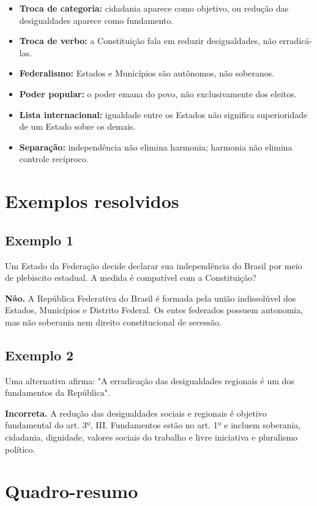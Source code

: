 \documentclass[11pt,a4paper]{article}
\begin{document}
\begin{itemize}
  \item \textbf{Troca de categoria:} cidadania aparece como objetivo, ou redução das desigualdades aparece como fundamento.
  \item \textbf{Troca de verbo:} a Constituição fala em reduzir desigualdades, não erradicá-las.
  \item \textbf{Federalismo:} Estados e Municípios são autônomos, não soberanos.
  \item \textbf{Poder popular:} o poder emana do povo, não exclusivamente dos eleitos.
  \item \textbf{Lista internacional:} igualdade entre os Estados não significa superioridade de um Estado sobre os demais.
  \item \textbf{Separação:} independência não elimina harmonia; harmonia não elimina controle recíproco.
\end{itemize}

\section*{Exemplos resolvidos}

\subsection*{Exemplo 1}

Um Estado da Federação decide declarar sua independência do Brasil por meio de plebiscito estadual. A medida é compatível com a Constituição?

\textbf{Não.} A República Federativa do Brasil é formada pela união indissolúvel dos Estados, Municípios e Distrito Federal. Os entes federados possuem autonomia, mas não soberania nem direito constitucional de secessão.

\subsection*{Exemplo 2}

Uma alternativa afirma: "A erradicação das desigualdades regionais é um dos fundamentos da República".

\textbf{Incorreta.} A redução das desigualdades sociais e regionais é objetivo fundamental do art. 3º, III. Fundamentos estão no art. 1º e incluem soberania, cidadania, dignidade, valores sociais do trabalho e livre iniciativa e pluralismo político.

\section*{Quadro-resumo}
\end{document}
